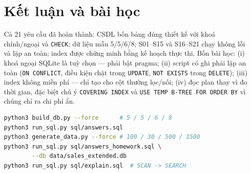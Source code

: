 \documentclass[10pt,a4paper,twocolumn]{article}
\newcommand{\code}[1]{\texttt{\small #1}}
\begin{document}
\section{Kết luận và bài học}

Cả 21 yêu cầu đã hoàn thành: CSDL bốn bảng đúng thiết kế với khoá chính/ngoại và \code{CHECK};
dữ liệu mẫu 5/5/6/8; S01--S15 và S16--S21 chạy không lỗi và lặp an toàn; index được chứng minh
bằng kế hoạch thực thi. Bốn bài học: (i) khoá ngoại SQLite là tuỳ chọn --- phải bật pragma;
(ii) script có ghi phải lặp an toàn (\code{ON CONFLICT}, điều kiện chặt trong \code{UPDATE},
\code{NOT EXISTS} trong \code{DELETE}); (iii) index không miễn phí --- chỉ tạo cho cột thường
lọc/nối; (iv) đọc plan thay vì đo thời gian, đặc biệt chú ý \code{COVERING INDEX} và
\code{USE TEMP B-TREE FOR ORDER BY} vì chúng chỉ ra chi phí ẩn.

\begin{lstlisting}[language=bash,caption={Lệnh tái lập toàn bộ kết quả}]
python3 build_db.py --force      # 5 / 5 / 6 / 8
python3 run_sql.py sql/answers.sql
python3 generate_data.py --force # 100 / 30 / 500 / 1500
python3 run_sql.py sql/answers_homework.sql \
        --db data/sales_extended.db
python3 run_sql.py sql/explain.sql  # SCAN -> SEARCH
\end{lstlisting}
\end{document}
